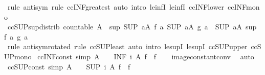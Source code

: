 \begin{isabellebody}
\isamarkupfalse%
\ {\isacharparenleft}rule\ antisym{\isacharparenright}\ {\isacharparenleft}rule\ ccINF{\isacharunderscore}greatest{\isacharcomma}\ auto\ intro{\isacharcolon}\ le{\isacharunderscore}infI{}\ le{\isacharunderscore}infI{}\ ccINF{\isacharunderscore}lower\ ccINF{\isacharunderscore}mono{\isacharparenright}%
\endisatagproof
{\isafoldproof}%
%
\isadelimproof
\isanewline
%
\endisadelimproof
\isanewline
{}\isamarkupfalse%
\ ccSUP{\isacharunderscore}sup{\isacharunderscore}distrib{\isacharcolon}\ {\isachardoublequoteopen}countable\ A\ {\isasymLongrightarrow}\ sup\ {\isacharparenleft}SUP\ a{\isacharcolon}A{\isachardot}\ f\ a{\isacharparenright}\ {\isacharparenleft}SUP\ a{\isacharcolon}A{\isachardot}\ g\ a{\isacharparenright}\ {\isacharequal}\ {\isacharparenleft}SUP\ a{\isacharcolon}A{\isachardot}\ sup\ {\isacharparenleft}f\ a{\isacharparenright}\ {\isacharparenleft}g\ a{\isacharparenright}{\isacharparenright}{\isachardoublequoteclose}\isanewline
%
\isadelimproof
\ \ %
\endisadelimproof
%
\isatagproof
{}\isamarkupfalse%
\ {\isacharparenleft}rule\ antisym{\isacharbrackleft}rotated{\isacharbrackright}{\isacharparenright}\ {\isacharparenleft}rule\ ccSUP{\isacharunderscore}least{\isacharcomma}\ auto\ intro{\isacharcolon}\ le{\isacharunderscore}supI{}\ le{\isacharunderscore}supI{}\ ccSUP{\isacharunderscore}upper\ ccSUP{\isacharunderscore}mono{\isacharparenright}%
\endisatagproof
{\isafoldproof}%
%
\isadelimproof
\isanewline
%
\endisadelimproof
\isanewline
{}\isamarkupfalse%
\ ccINF{\isacharunderscore}const\ {\isacharbrackleft}simp{\isacharbrackright}{\isacharcolon}\ {\isachardoublequoteopen}A\ {\isasymnoteq}\ {\isacharbraceleft}{\isacharbraceright}\ {\isasymLongrightarrow}\ {\isacharparenleft}INF\ i\ {\isacharcolon}A{\isachardot}\ f{\isacharparenright}\ {\isacharequal}\ f{\isachardoublequoteclose}\isanewline
%
\isadelimproof
\ \ %
\endisadelimproof
%
\isatagproof
{}\isamarkupfalse%
\ image{\isacharunderscore}constant{\isacharunderscore}conv\ \isamarkupfalse%
\ auto%
\endisatagproof
{\isafoldproof}%
%
\isadelimproof
\isanewline
%
\endisadelimproof
\isanewline
{}\isamarkupfalse%
\ ccSUP{\isacharunderscore}const\ {\isacharbrackleft}simp{\isacharbrackright}{\isacharcolon}\ {\isachardoublequoteopen}A\ {\isasymnoteq}\ {\isacharbraceleft}{\isacharbraceright}\ {\isasymLongrightarrow}\ {\isacharparenleft}SUP\ i\ {\isacharcolon}A{\isachardot}\ f{\isacharparenright}\ {\isacharequal}\ f{\isachardoublequoteclose}\isanewline

\end{isabellebody}
